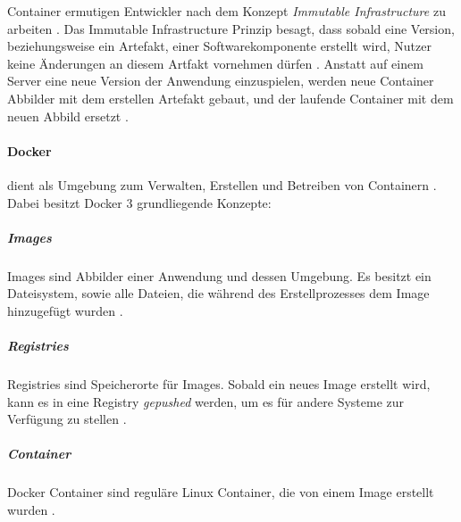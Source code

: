Container ermutigen Entwickler nach dem Konzept \emph{Immutable Infrastructure} zu arbeiten \cite{Burns2019}.
Das Immutable Infrastructure Prinzip besagt, dass sobald eine Version, beziehungsweise ein Artefakt, einer Softwarekomponente erstellt wird,
Nutzer keine Änderungen an diesem Artfakt vornehmen dürfen \cite{Burns2019}. 
Anstatt auf einem Server eine neue Version der Anwendung einzuspielen, werden neue Container Abbilder mit dem erstellen Artefakt gebaut, 
und der laufende Container mit dem neuen Abbild ersetzt \cite{Burns2019}.

\paragraph{Docker}
dient als Umgebung zum Verwalten, Erstellen und Betreiben von Containern \cite{Marko2018}.
Dabei besitzt Docker 3 grundliegende Konzepte:

\subparagraph{Images}
Images sind Abbilder einer Anwendung und dessen Umgebung.
Es besitzt ein Dateisystem, sowie alle Dateien, die während des Erstellprozesses dem Image hinzugefügt wurden \cite{Marko2018}.

\subparagraph{Registries}
Registries sind Speicherorte für Images. Sobald ein neues Image erstellt wird, kann es in eine Registry \emph{gepushed} werden,
um es für andere Systeme zur Verfügung zu stellen \cite{Marko2018}.

\subparagraph{Container}
Docker Container sind reguläre Linux Container, die von einem Image erstellt wurden \cite{Marko2018}.